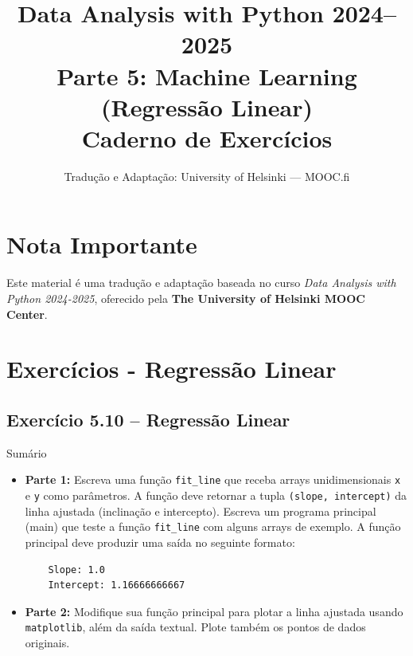 \documentclass[11pt,a4paper]{article}
\title{\textbf{Data Analysis with Python 2024--2025}\\Parte 5: Machine Learning (Regressão Linear)\\\large Caderno de Exercícios}
\author{Tradução e Adaptação: University of Helsinki --- MOOC.fi}
\date{}
\begin{document}
\maketitle

\section*{Nota Importante}
Este material é uma tradução e adaptação baseada no curso \textit{Data Analysis with Python 2024-2025}, oferecido pela \textbf{The University of Helsinki MOOC Center}.

\tableofcontents
\newpage

\section{Exercícios - Regressão Linear}

\subsection*{Exercício 5.10 -- Regressão Linear}
\begin{exercicio}{Sumário}
\begin{itemize}
    \item \textbf{Parte 1:} Escreva uma função \texttt{fit\_line} que receba arrays unidimensionais \texttt{x} e \texttt{y} como parâmetros. A função deve retornar a tupla \texttt{(slope, intercept)} da linha ajustada (inclinação e intercepto). Escreva um programa principal (main) que teste a função \texttt{fit\_line} com alguns arrays de exemplo. A função principal deve produzir uma saída no seguinte formato:
    \begin{verbatim}
    Slope: 1.0
    Intercept: 1.16666666667
    \end{verbatim}
    \item \textbf{Parte 2:} Modifique sua função principal para plotar a linha ajustada usando \texttt{matplotlib}, além da saída textual. Plote também os pontos de dados originais.
\end{itemize}
\end{exercicio}
\end{document}
